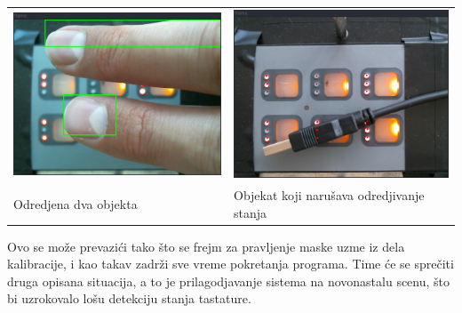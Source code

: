 \documentclass[a4paper,12pt, projekat]{etf}
\begin{document}
        \begin{table}[h!]
            \begin{tabular}{ll}
                \includegraphics[scale=0.3]{intrusionSecond.png} &
                \includegraphics[scale=0.3]{intrusionThird.png} \\
                Odredjena dva objekta &
                Objekat koji naru\v{s}ava odredjivanje stanja
            \end{tabular}
        \end{table}

        Ovo se mo\v{z}e prevazi\'{c}i tako \v{s}to se frejm za pravljenje
        maske uzme iz dela kalibracije, i kao takav zadr\v{z}i sve vreme
        pokretanja programa. Time \'{c}e se spre\v{c}iti druga opisana
        situacija, a to je prilagodjavanje sistema na novonastalu scenu,
        \v{s}to bi uzrokovalo lo\v{s}u detekciju stanja tastature.
\end{document}
